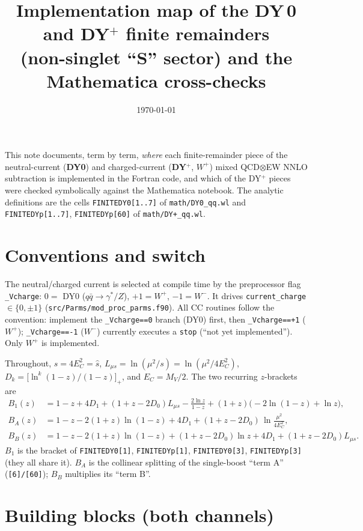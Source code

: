 \documentclass[11pt]{article}
\title{\bf Implementation map of the DY\,0 and DY${}^{+}$ finite remainders\\
\large (non-singlet ``S'' sector) and the Mathematica cross-checks}
\author{}
\date{\today}
\newcommand{\code}[1]{\texttt{#1}}
\newcommand{\file}[1]{\texttt{#1}}
\newcommand{\Vc}{\code{\_Vcharge}}
\newcommand{\Lms}{\ensuremath{L_{\mu s}}}
\newcommand{\Dz}{\ensuremath{D_0}}\newcommand{\Do}{\ensuremath{D_1}}
\begin{document}
\maketitle

\noindent
This note documents, term by term, \emph{where} each finite-remainder piece of the
neutral-current (\textbf{DY0}) and charged-current (\textbf{DY${}^+$}, $W^+$) mixed
QCD$\otimes$EW NNLO subtraction is implemented in the Fortran code, and which of the
DY${}^+$ pieces were checked symbolically against the Mathematica notebook.
The analytic definitions are the cells \code{FINITEDY0[1..7]} of \file{math/DY0\_qq.wl}
and \code{FINITEDYp[1..7]}, \code{FINITEDYp[60]} of \file{math/DY+\_qq.wl}.

\section{Conventions and switch}

The neutral/charged current is selected at compile time by the preprocessor flag
\Vc: \;$0=$ DY0 ($q\bar q\to\gamma^*/Z$), \;$+1=W^+$, \;$-1=W^-$.
It drives \code{current\_charge} $\in\{0,\pm1\}$ (\file{src/Parms/mod\_proc\_parms.f90}).
All CC routines follow the convention: implement the \code{\_Vcharge==0} branch (DY0)
first, then \code{\_Vcharge==+1} ($W^+$); \code{\_Vcharge==-1} ($W^-$) currently executes a
\code{stop} (``not yet implemented''). Only $W^+$ is implemented.

Throughout, $s=4E_C^2=\hat s$, $\Lms=\ln(\mu^2/s)=\ln(\mu^2/4E_C^2)$,
$D_k=\big[\ln^k(1-z)/(1-z)\big]_+$, and $E_C=M_V/2$.
The two recurring $z$-brackets are
\begin{align}
B_1(z) &= 1-z+4\Do+(1+z-2\Dz)\Lms-\tfrac{2\ln z}{1-z}+(1+z)\big(-2\ln(1-z)+\ln z\big),
\label{eq:B1}\\
B_A(z) &= 1-z-2(1+z)\ln(1-z)+4\Do+(1+z-2\Dz)\,\ln\!\tfrac{\mu^2}{4E_C^2},
\label{eq:BA}\\
B_B(z) &= 1-z-2(1+z)\ln(1-z)+(1+z-2\Dz)\ln z+4\Do+(1+z-2\Dz)\Lms.
\label{eq:BB}
\end{align}
$B_1$ is the bracket of \code{FINITEDY0[1]}, \code{FINITEDYp[1]}, \code{FINITEDY0[3]},
\code{FINITEDYp[3]} (they all share it). $B_A$ is the collinear splitting of the
single-boost ``term A'' (\code{[6]/[60]}); $B_B$ multiplies its ``term B''.

\section{Building blocks (both channels)}
\label{sec:blocks}
\end{document}
